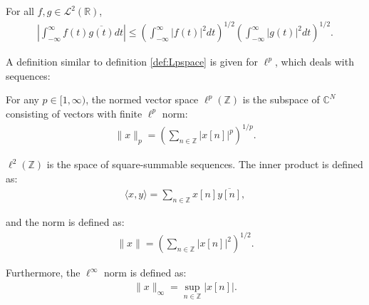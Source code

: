 \begin{theorem}
For all $f,g \in \mathcal{L}^2(\mathbb{R})$,
\begin{align*}
\left| \int_{-\infty}^\infty f(t) \overline{g(t)} dt \right| \leq \left( \int_{-\infty}^\infty |f(t)|^2 dt \right)^{1/2} \left( \int_{-\infty}^\infty |g(t)|^2 dt \right)^{1/2}.
\end{align*}
\end{theorem}

A definition similar to definition \ref{def:Lpspace} is given for $\ell^p$, which deals with sequences:
\begin{definition}
For any $p \in [1,\infty)$, the normed vector space $\ell^p(\mathbb{Z})$ is the subspace of $\mathbb{C}^N$ consisting of vectors with finite $\ell^p$ norm:
\begin{align*}
\|x\|_p = \left( \sum_{n\in\mathbb{Z}} |x[n]|^p \right)^{1/p}.
\end{align*}

$\ell^2(\mathbb{Z})$ is the space of square-summable sequences. The inner product is defined as:
\begin{align*}
\langle x,y \rangle = \sum_{n\in\mathbb{Z}} x[n] \overline{y[n]},
\end{align*}

and the norm is defined as:
\begin{align*}
\|x\| = \left( \sum_{n\in\mathbb{Z}} |x[n]|^2 \right)^{1/2}.
\end{align*}

Furthermore, the $\ell^\infty$ norm is defined as:
\begin{align*}
\|x\|_\infty = \sup_{n\in\mathbb{Z}}|x[n]|.
\end{align*}
\end{definition}